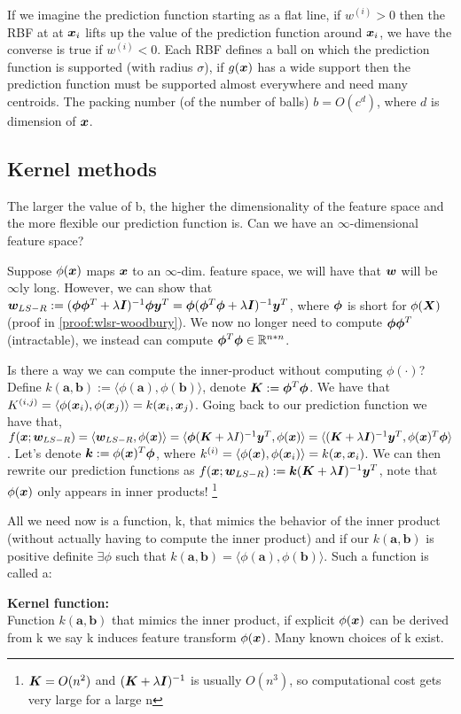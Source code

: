 If we imagine the prediction function starting as a flat line, if $w^{(i)}>0$ then the RBF at at $\bm{x}_{i}$ lifts up the value of the prediction function around $\bm{x}_{i}$, we have the converse is true if $w^{(i)}<0$. Each RBF defines a ball on which the prediction function is supported (with radius $\sigma$), if $g(\bm{x})$ has a wide support then the prediction function must be supported almost everywhere and need many centroids. The packing number (of the number of balls) $b=O(c^{d})$, where $d$ is dimension of $\bm{x}$. 

\subsection{Kernel methods}
The larger the value of b, the higher the dimensionality of the feature space and the more flexible our prediction function is. Can we have an $\infty$-dimensional feature space? 

Suppose $\phi(\bm{x})$ maps $\bm{x}$ to an $\infty$-dim. feature space, we will have that $\bm{w}$ will be $\infty$ly long. However, we can show that $\bm{w}_{LS-R} := (\bm{\phi} \bm{\phi}^{T} + \lambda \bm{I})^{-1} \bm{\phi} \bm{y}^{T} = \bm{\phi} ( \bm{\phi}^{T} \bm{\phi} + \lambda \bm{I})^{-1} \bm{y}^{T}$, where $\bm{\phi}$ is short for $\phi(\bm{X})$ (proof in \cref{proof:wlsr-woodbury}). We now no longer need to compute $\bm{\phi} \bm{\phi}^{T}$ (intractable), we instead can compute $\bm{\phi}^{T} \bm{\phi} \in \mathbb{R}^{n*n}$.

Is there a way we can compute the inner-product without computing $\phi(\cdot)$? Define $k(\bm{a},\bm{b}) := \langle \phi(\bm{a}), \phi(\bm{b}) \rangle$, denote $\bm{K} := \bm{\phi}^{T} \bm{\phi} $. We have that $K^{(i,j)} = \langle \phi(\bm{x}_{i}), \phi(\bm{x}_{j}) \rangle = k(\bm{x}_{i}, \bm{x}_{j})$. Going back to our prediction function we have that, $f(\bm{x} ; \bm{w}_{LS-R}) = \langle \bm{w}_{LS-R} , \phi(\bm{x}) \rangle = \langle \bm{\phi}(\bm{K} + \lambda I)^{-1} \bm{y}^{T} , \phi(\bm{x}) \rangle = \langle (\bm{K}+\lambda \bm{I})^{-1} \bm{y}^{T}, \phi(\bm{x})^{T} \bm{\phi} \rangle $. Let's denote $\bm{k} := \phi(\bm{x})^{T} \bm{\phi}$, where $k^{(i)} = \langle \phi(\bm{x}), \phi(\bm{x}_{i}) \rangle = k(\bm{x}, \bm{x}_{i})$. We can then rewrite our prediction functions as $f(\bm{x} ; \bm{w}_{LS-R}) := \bm{k} (\bm{K} + \lambda \bm{I})^{-1} \bm{y}^{T}$, note that $\phi(\bm{x})$ only appears in inner products! \footnote{$\bm{K}=O(n^{2})$ and $(\bm{K} + \lambda \bm{I})^{-1}$ is usually $O(n^{3})$, so computational cost gets very large for a large n}

All we need now is a function, k, that mimics the behavior of the inner product (without actually having to compute the inner product) and if our $k(\bm{a}, \bm{b})$ is positive definite $\exists \phi$ such that $k(\bm{a}, \bm{b}) = \langle \phi(\bm{a}), \phi(\bm{b}) \rangle$. Such a function is called a:
\begin{definition}
    \textbf{Kernel function:} \\
    Function $k(\bm{a}, \bm{b})$ that mimics the inner product, if explicit $\phi(\bm{x})$ can be derived from k we say k induces feature transform $\phi(\bm{x})$. Many known choices of k exist.
\end{definition}

